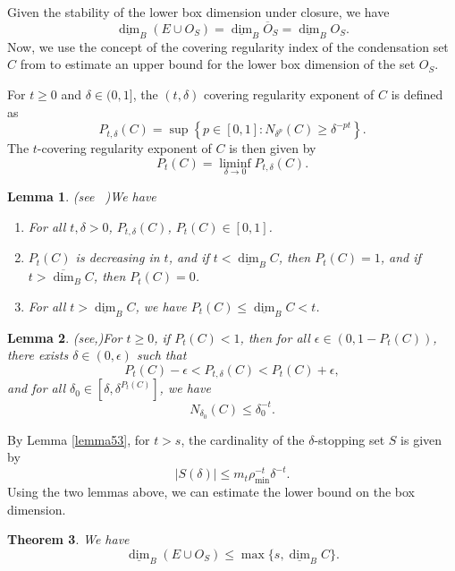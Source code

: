 \documentclass[12pt,oneside,reqno]{amsart}
\newtheorem{theorem}{Theorem}[section]
\newtheorem{lemma}[theorem]{Lemma}
\theoremstyle{definition}
\theoremstyle{remark}
\begin{document}
Given the stability of the lower box dimension under closure, we have 
\[
\underline{\dim}_B (E \cup O_S) = \underline{\dim}_B \overline{O}_S = \underline{\dim}_B O_S.
\]
Now, we use the concept of the covering regularity index of the condensation set $C$ from \cite{Fraser1} to estimate an upper bound for the lower box dimension of the set $O_S$. 

For $t \geq 0$ and $\delta \in (0,1]$, the $(t,\delta)$ covering regularity exponent of $C$ is defined as
\[
P_{t,\delta} (C) = \sup \left\{ p \in [0,1] : N_{\delta^p} (C) \geq \delta^{-pt} \right\}.
\]
The $t$-covering regularity exponent of $C$ is then given by
\[
P_{t} (C) = \liminf_{\delta \to 0} P_{t,\delta}(C).
\]

\begin{lemma}(see ~\cite[Lemma ~ 2.6]{Fraser1})\label{lem1}
    We have
    \begin{enumerate}
        \item For all \(t, \delta > 0\), \(P_{t, \delta}(C)\), \(P_t(C) \in [0, 1]\).
        \item \(P_t(C)\) is decreasing in \(t\), and if \(t < \underline{\dim}_B C\), then \(P_t(C) = 1\), and if \(t > \overline{\dim}_B C\), then \(P_t(C) = 0\).
        \item For all \(t > \underline{\dim}_B C\), we have \(P_t(C) \le \underline{\dim}_B C < t\).
    \end{enumerate}
\end{lemma}

\begin{lemma}(see,\cite[Lemma~ 3.6]{Fraser1})\label{lem2}
    For \(t \ge 0\), if \(P_t(C) < 1\), then for all \(\epsilon \in (0, 1 - P_t(C))\), there exists \(\delta \in (0, \epsilon)\) such that
    \[
    P_t(C) - \epsilon < P_{t, \delta}(C) < P_t(C) + \epsilon,
    \]
    and for all \(\delta_0 \in [\delta, \delta^{P_t(C)}]\), we have
    \[
    N_{\delta_0}(C) \le \delta_0^{-t}.
    \]
\end{lemma}

By Lemma \ref{lemma53}, for \(t > s\), the cardinality of the \(\delta\)-stopping set \(S\) is given by
\[
|S(\delta)| \le m_t \rho_{\min}^{-t} \delta^{-t}.
\]
Using the two lemmas above, we can estimate the lower bound on the box dimension.

\begin{theorem}
    We have
    \[
    \underline{\dim}_B (E \cup O_S) \le \max \{s, \underline{\dim}_B C\}.
    \]
\end{theorem}
\end{document}
